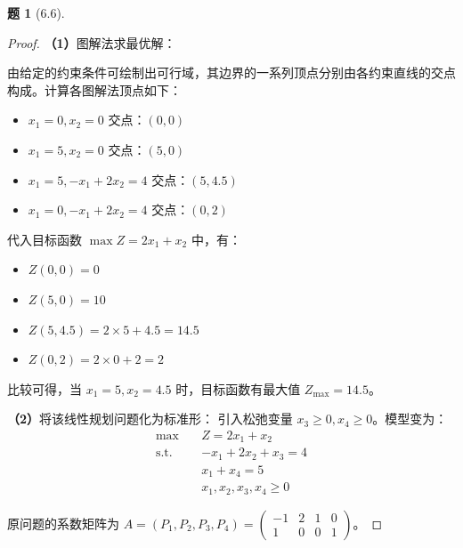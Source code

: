 \documentclass[11pt, a4paper]{article}
\newtheorem{problem}{题}
\begin{document}
\begin{problem}[6.6]
\end{problem}

\begin{proof}
    \textbf{（1）}图解法求最优解：

    由给定的约束条件可绘制出可行域，其边界的一系列顶点分别由各约束直线的交点构成。计算各图解法顶点如下：
    \begin{itemize}
        \item $x_1=0, x_2=0$ 交点：$(0, 0)$
        \item $x_1=5, x_2=0$ 交点：$(5, 0)$
        \item $x_1=5, -x_1+2x_2=4$ 交点：$(5, 4.5)$
        \item $x_1=0, -x_1+2x_2=4$ 交点：$(0, 2)$
    \end{itemize}

    代入目标函数 $\max Z = 2x_1 + x_2$ 中，有：
    \begin{itemize}
        \item $Z(0, 0) = 0$
        \item $Z(5, 0) = 10$
        \item $Z(5, 4.5) = 2 \times 5 + 4.5 = 14.5$
        \item $Z(0, 2) = 2 \times 0 + 2 = 2$
    \end{itemize}
    比较可得，当 $x_1 = 5, x_2 = 4.5$ 时，目标函数有最大值 $Z_{\max} = 14.5$。

    \vspace{1em}
    \textbf{（2）}将该线性规划问题化为标准形：
    引入松弛变量 $x_3 \ge 0, x_4 \ge 0$。模型变为：
    $$
        \begin{aligned}
            \max \quad & Z = 2x_1 + x_2           \\
            \text{s.t.} \quad
                       & -x_1 + 2x_2 + x_3 = 4    \\
                       & x_1 + x_4 = 5            \\
                       & x_1, x_2, x_3, x_4 \ge 0
        \end{aligned}
    $$

    原问题的系数矩阵为 $A = (P_1, P_2, P_3, P_4) = \begin{pmatrix} -1 & 2 & 1 & 0 \\ 1 & 0 & 0 & 1 \end{pmatrix}$。


\end{proof}
\end{document}
